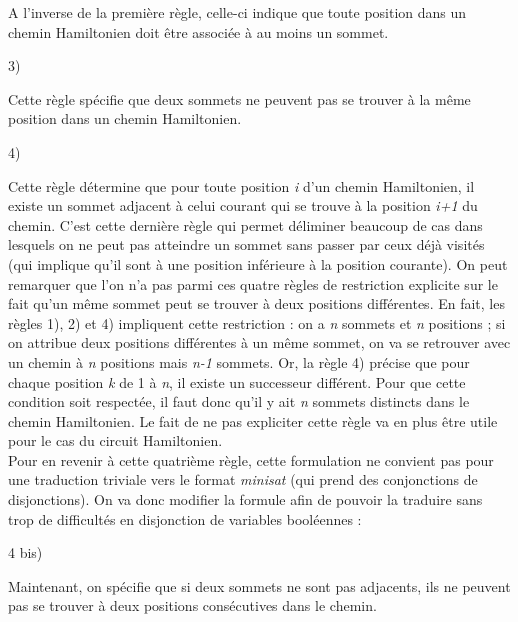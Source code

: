 \documentclass{article}
\begin{document}
A l'inverse de la premi\`ere r\`egle, celle-ci indique que toute position dans un chemin Hamiltonien doit
\^etre associ\'ee \`a au moins un sommet.

3) %

Cette r\`egle sp\'ecifie que deux sommets ne peuvent pas se trouver \`a la m\^eme position dans un chemin
Hamiltonien.

4)%

Cette r\`egle d\'etermine que pour toute position \textit{i} d'un chemin Hamiltonien, il existe un sommet adjacent \`a
celui courant qui se trouve \`a la position \textit{i+1} du chemin. C'est cette derni\`ere r\`egle qui permet
d\'eliminer beaucoup de cas dans lesquels on ne peut pas atteindre un sommet sans passer par ceux d\'ej\`a visit\'es
(qui implique qu'il sont \`a une position inf\'erieure \`a la position courante). On peut remarquer que l'on n'a pas
parmi ces quatre r\`egles de restriction explicite sur le fait qu'un m\^eme sommet peut se trouver \`a deux positions
diff\'erentes. En fait, les r\`egles 1), 2) et 4) impliquent cette restriction : on a \textit{n} sommets et \textit{n}
positions ; si on attribue deux positions diff\'erentes \`a un m\^eme sommet, on va se retrouver avec un chemin \`a
\textit{n} positions mais \textit{n-1} sommets. Or, la r\`egle 4) pr\'ecise que pour chaque position \textit{k} de 1 \`a
\textit{n}, il existe un successeur diff\'erent. Pour que cette condition soit respect\'ee, il faut donc qu'il y ait
\textit{n} sommets distincts dans le chemin Hamiltonien. Le fait de ne pas expliciter cette r\`egle va en plus
\^etre utile pour le cas du circuit Hamiltonien.\\

Pour en revenir \`a cette quatri\`eme r\`egle, cette formulation ne convient pas pour une traduction triviale vers le
format \textit{minisat} (qui prend des conjonctions de disjonctions). On va donc modifier la formule afin de pouvoir
la traduire sans trop de difficult\'es en disjonction de variables bool\'eennes :

4 bis)%

Maintenant, on sp\'ecifie que si deux sommets ne sont pas adjacents, ils ne peuvent pas se trouver \`a deux positions
cons\'ecutives dans le chemin.\\
\end{document}
